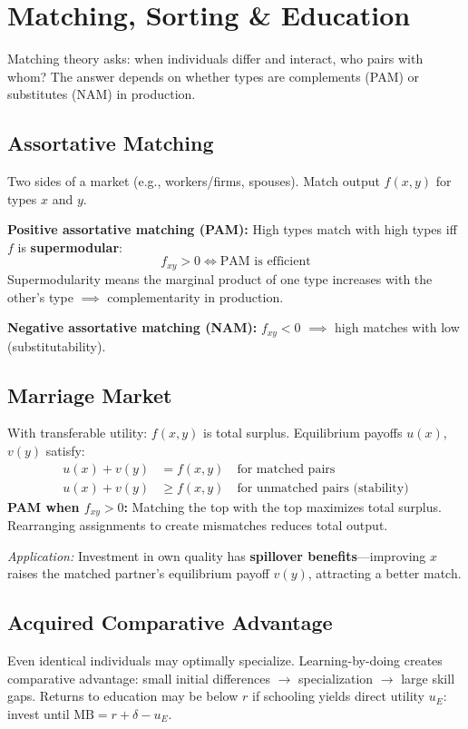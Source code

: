 \section{Matching, Sorting \& Education}
Matching theory asks: when individuals differ and interact, who pairs with whom? The answer depends on whether types are complements (PAM) or substitutes (NAM) in production.

\subsection{Assortative Matching}
Two sides of a market (e.g., workers/firms, spouses). Match output $f(x,y)$ for types $x$ and $y$.

\textbf{Positive assortative matching (PAM):} High types match with high types iff $f$ is \textbf{supermodular}:
$$f_{xy} > 0 \iff \text{PAM is efficient}$$
Supermodularity means the marginal product of one type increases with the other's type $\implies$ complementarity in production.

\textbf{Negative assortative matching (NAM):} $f_{xy} < 0$ $\implies$ high matches with low (substitutability).

\subsection{Marriage Market}
With transferable utility: $f(x,y)$ is total surplus. Equilibrium payoffs $u(x)$, $v(y)$ satisfy:
\begin{align*}
  u(x) + v(y) &= f(x,y) \quad \text{for matched pairs} \\
  u(x) + v(y) &\geq f(x,y) \quad \text{for unmatched pairs (stability)}
\end{align*}
\textbf{PAM when $f_{xy}>0$:} Matching the top with the top maximizes total surplus. Rearranging assignments to create mismatches reduces total output.

\textit{Application:} Investment in own quality has \textbf{spillover benefits}---improving $x$ raises the matched partner's equilibrium payoff $v(y)$, attracting a better match.

\subsection{Acquired Comparative Advantage}
Even identical individuals may optimally specialize. Learning-by-doing creates comparative advantage: small initial differences $\to$ specialization $\to$ large skill gaps. Returns to education may be below $r$ if schooling yields direct utility $u_E$: invest until $\text{MB} = r + \delta - u_E$.

